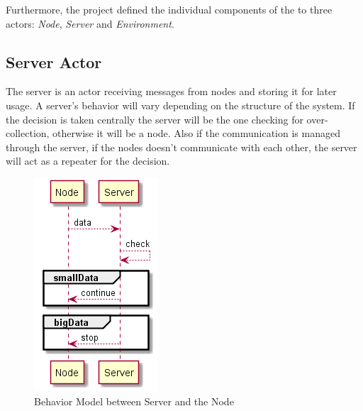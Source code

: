 Furthermore, the project defined the individual components of the \wsn to three actors: \textit{Node}, \textit{Server} and \textit{Environment}.






\subsection{Server Actor}

The server is an actor receiving messages from nodes and storing it for later usage. A server's behavior will vary depending on the structure of the system. If the decision is taken centrally the server will be the one checking for over-collection, otherwise it will be a node. Also if the communication is managed through the server, if the nodes doesn't communicate with each other, the server will act as a repeater for the decision. 

\begin{figure}[ht]
    \includegraphics{include/figures/server_behav}
    \caption{Behavior Model between Server and the Node}
    \label{fig:node_server_behav}
\end{figure}

